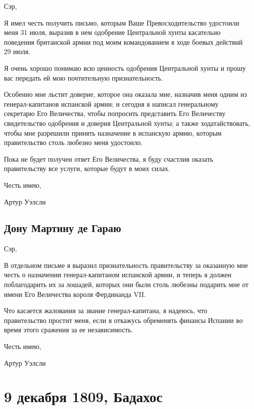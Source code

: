\documentclass[
  oneside,
  12pt,
  titlepage]{book}
\begin{document}
Сэр,

Я имел честь получить письмо, которым Ваше Превосходительство удостоили меня 31 июля, выразив в нем одобрение Центральной хунты касательно поведения британской армии под моим командованием в ходе боевых действий 29 июля.

Я очень хорошо понимаю всю ценность одобрения Центральной хунты и прошу вас передать ей мою почтительную признательность.

Особенно мне льстит доверие, которое она оказала мне, назначив меня одним из генерал-капитанов испанской армии; и сегодня я написал генеральному секретарю Его Величества, чтобы попросить представить Его Величеству свидетельство одобрения и доверия Центральной хунты; а также ходатайствовать, чтобы мне разрешили принять назначение в испанскую армию, которым правительство столь любезно меня удостоило.

Пока не будет получен ответ Его Величества, я буду счастлив оказать правительству все услуги, которые будут в моих силах.

Честь имею,

Артур Уэлсли

\hypertarget{ux434ux43eux43dux443-ux43cux430ux440ux442ux438ux43dux443-ux434ux435-ux433ux430ux440ux430ux44e-1}{%
\chapter{Дону Мартину де Гараю}\label{ux434ux43eux43dux443-ux43cux430ux440ux442ux438ux43dux443-ux434ux435-ux433ux430ux440ux430ux44e-1}}

Сэр,

В отдельном письме я выразил признательность правительству за оказанную мне честь о назначении генерал-капитаном испанской армии, и теперь я должен поблагодарить их за лошадей, которых они были столь любезны подарить мне от имени Его Величества короля Фердинанда VII.

Что касается жалования за звание генерал-капитана, я надеюсь, что правительство простит меня, если я откажусь обременять финансы Испании во время этого сражения за ее независимость.

Честь имею,

Артур Уэлсли

\hypertarget{part-9-ux434ux435ux43aux430ux431ux440ux44f-1809-ux431ux430ux434ux430ux445ux43eux441}{%
\part*{9 декабря 1809, Бадахос}\label{part-9-ux434ux435ux43aux430ux431ux440ux44f-1809-ux431ux430ux434ux430ux445ux43eux441}}
\end{document}
